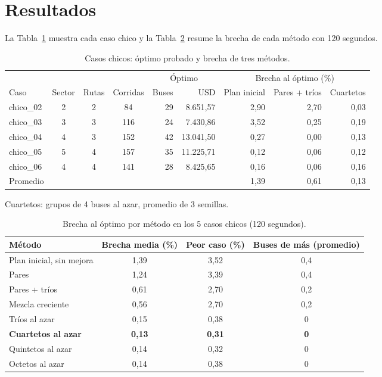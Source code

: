 \documentclass[11pt,a4paper]{article}
\begin{document}
\section{Resultados}
La Tabla~\ref{tab:casos} muestra cada caso chico y la Tabla~\ref{tab:metodos} resume
la brecha de cada método con 120 segundos.

\begin{table}[h]
\centering
\small
\caption{Casos chicos: óptimo probado y brecha de tres métodos.}
\label{tab:casos}
\begin{tabular}{lcccrrrrr}
\toprule
 & & & & \multicolumn{2}{c}{Óptimo} & \multicolumn{3}{c}{Brecha al óptimo (\%)} \\
\cmidrule(lr){5-6}\cmidrule(lr){7-9}
Caso & Sector & Rutas & Corridas & Buses & USD & Plan inicial & Pares + tríos & Cuartetos \\
\midrule
chico\_02 & 2 & 2 & 84  & 29 & 8.651,57  & 2,90 & 2,70 & 0,03 \\
chico\_03 & 3 & 3 & 116 & 24 & 7.430,86  & 3,52 & 0,25 & 0,19 \\
chico\_04 & 4 & 3 & 152 & 42 & 13.041,50 & 0,27 & 0,00 & 0,13 \\
chico\_05 & 5 & 4 & 157 & 35 & 11.225,71 & 0,12 & 0,06 & 0,12 \\
chico\_06 & 4 & 4 & 141 & 28 & 8.425,65  & 0,16 & 0,06 & 0,16 \\
\midrule
Promedio  &   &   &     &    &           & 1,39 & 0,61 & 0,13 \\
\bottomrule
\end{tabular}

\vspace{2pt}
{\footnotesize Cuartetos: grupos de 4 buses al azar, promedio de 3 semillas.}
\end{table}

\begin{table}[h]
\centering
\small
\caption{Brecha al óptimo por método en los 5 casos chicos (120 segundos).}
\label{tab:metodos}
\begin{tabular}{lccc}
\toprule
Método & Brecha media (\%) & Peor caso (\%) & Buses de más (promedio) \\
\midrule
Plan inicial, sin mejora   & 1,39 & 3,52 & 0,4 \\
Pares                      & 1,24 & 3,39 & 0,4 \\
Pares + tríos              & 0,61 & 2,70 & 0,2 \\
Mezcla creciente           & 0,56 & 2,70 & 0,2 \\
Tríos al azar              & 0,15 & 0,38 & 0 \\
\textbf{Cuartetos al azar} & \textbf{0,13} & \textbf{0,31} & \textbf{0} \\
Quintetos al azar          & 0,14 & 0,32 & 0 \\
Octetos al azar            & 0,14 & 0,38 & 0 \\
\bottomrule
\end{tabular}
\end{table}
\end{document}
